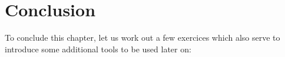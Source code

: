 
\section{Conclusion}

To conclude this chapter, let us work out a few exercices
which also serve to introduce some additional tools to be used later on:

